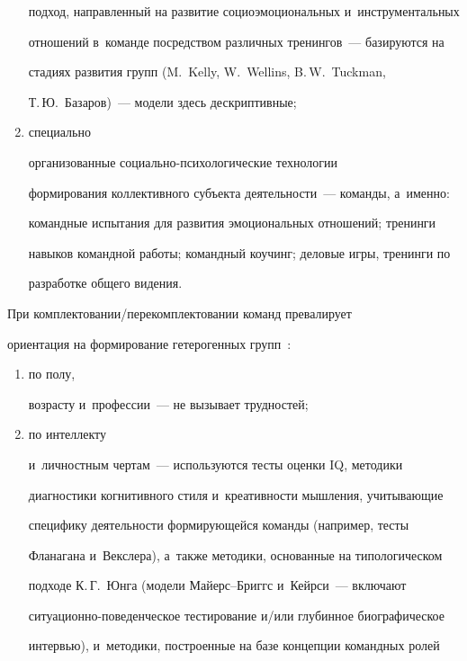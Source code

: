 \begin{multicols}{2}
\begin{enumerate}[(1)]
подход, на\-прав\-лен\-ный на развитие социоэмоциональных и~инструментальных 

отношений в~команде по\-сред\-ст\-вом различных тренингов~--- базируются на 

стадиях развития групп (M.~Kelly, W.~Wellins, B.\,W.~Tuckman, 

Т.\,Ю.~Базаров)~--- модели здесь дескриптивные; 

\item специально 

организованные со\-ци\-аль\-но-пси\-хо\-ло\-ги\-че\-ские технологии 

формирования коллективного субъекта дея\-тель\-ности~--- команды, а~именно: 

командные испытания для развития эмоциональных отношений; тренинги 

навыков командной работы; командный коучинг; деловые игры, тренинги по 

разработке общего видения. 

\end{enumerate}

  

  При комплектовании/пе\-ре\-комп\-лек\-то\-ва\-нии команд превалирует 

ориентация на формирование гетерогенных групп~\cite{30-r}: 

\begin{enumerate}[(1)]

\item по полу, 

возрасту и~профессии~--- не вызывает трудностей; 

\item по интеллекту 

и~личностным чертам~--- используются тес\-ты оценки IQ, методики 

диагностики когнитивного стиля и~креативности мышления, учитывающие 

специфику дея\-тель\-ности фор\-ми\-ру\-ющей\-ся команды (например, тесты 

Фланагана и~Векслера), а~так\-же методики, основанные на типологическом 

подходе К.\,Г.~Юнга (модели Май\-ерс--Бриггс и~Кейрси~--- включают 

си\-ту\-а\-ци\-он\-но-по\-ве\-ден\-че\-ское тес\-ти\-ро\-ва\-ние и/или глубинное био\-гра\-фи\-че\-ское 

ин\-тервью), и~методики, по\-стро\-ен\-ные на базе концепции командных ролей 


\end{enumerate}
\end{multicols}
